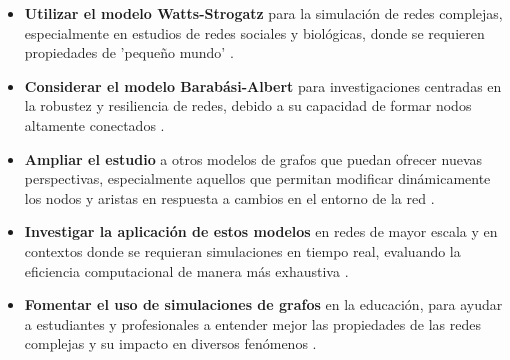 \begin{itemize}
    \item \textbf{Utilizar el modelo Watts-Strogatz} para la simulación de redes complejas, especialmente en estudios de redes sociales y biológicas, donde se requieren propiedades de 'pequeño mundo' .
    \item \textbf{Considerar el modelo Barabási-Albert} para investigaciones centradas en la robustez y resiliencia de redes, debido a su capacidad de formar nodos altamente conectados .
    \item \textbf{Ampliar el estudio} a otros modelos de grafos que puedan ofrecer nuevas perspectivas, especialmente aquellos que permitan modificar dinámicamente los nodos y aristas en respuesta a cambios en el entorno de la red .
    \item \textbf{Investigar la aplicación de estos modelos} en redes de mayor escala y en contextos donde se requieran simulaciones en tiempo real, evaluando la eficiencia computacional de manera más exhaustiva .
    \item \textbf{Fomentar el uso de simulaciones de grafos} en la educación, para ayudar a estudiantes y profesionales a entender mejor las propiedades de las redes complejas y su impacto en diversos fenómenos .
\end{itemize}
